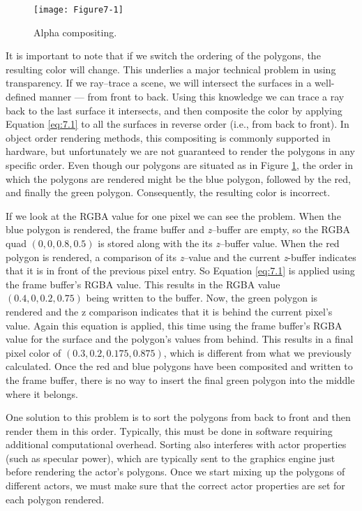 \begin{figure}[!htb]
	\centering
	\texttt{[image: Figure7-1]}\\
	\caption{Alpha compositing.}\label{fig:Figure7-1}
\end{figure}

It is important to note that if we switch the ordering of the polygons, the resulting color will change. This underlies a major technical problem in using transparency. If we ray--trace a scene, we will intersect the surfaces in a well-defined manner --- from front to back. Using this knowledge we can trace a ray back to the last surface it intersects, and then composite the color by applying Equation \ref{eq:7.1} to all the surfaces in reverse order (i.e., from back to front). In object order rendering methods, this compositing is commonly supported in hardware, but unfortunately we are not guaranteed to render the polygons in any specific order. Even though our polygons are situated as in Figure \ref{fig:Figure7-1}, the order in which the polygons are rendered might be the blue polygon, followed by the red, and finally the green polygon. Consequently, the resulting color is incorrect.

If we look at the RGBA value for one pixel we can see the problem. When the blue polygon is rendered, the frame buffer and \emph{z}--buffer are empty, so the RGBA quad $(0,0,0.8,0.5)$ is stored along with the its \emph{z}--buffer value. When the red polygon is rendered, a comparison of its \emph{z}--value and the current \emph{z}-buffer indicates that it is in front of the previous pixel entry. So Equation \ref{eq:7.1} is applied using the frame buffer's RGBA value. This results in the RGBA value $(0.4,0,0.2,0.75)$ being written to the buffer. Now, the green polygon is rendered and the z comparison indicates that it is behind the current pixel's value. Again this equation is applied, this time using the frame buffer's RGBA value for the surface and the polygon's values from behind. This results in a final pixel color of $(0.3,0.2, 0.175,0.875)$, which is different from what we previously calculated. Once the red and blue polygons have been composited and written to the frame buffer, there is no way to insert the final green polygon into the middle where it belongs.

One solution to this problem is to sort the polygons from back to front and then render them in this order. Typically, this must be done in software requiring additional computational overhead. Sorting also interferes with actor properties (such as specular power), which are typically sent to the graphics engine just before rendering the actor's polygons. Once we start mixing up the polygons of different actors, we must make sure that the correct actor properties are set for each polygon rendered.

